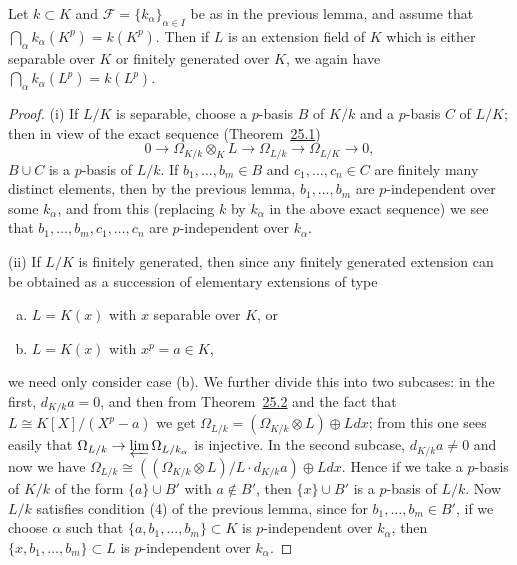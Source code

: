 \begin{lemma}\label{lem:30.5}
Let $k \subset K$ and $\mathcal{F} = \{k_\alpha\}_{\alpha \in I}$ be as in the previous lemma, and
assume that $\bigcap_\alpha k_\alpha(K^p) = k(K^p)$. Then if $L$ is an extension field of $K$
which is either separable over $K$ or finitely generated over $K$, we again have
$\bigcap_\alpha k_\alpha(L^p) = k(L^p)$.
\end{lemma}

\begin{proof}
(i) If $L/K$ is separable, choose a $p$-basis $B$ of $K/k$ and a $p$-basis $C$ of
$L/K$; then in view of the exact sequence (Theorem~\hyperref[thm:25.1]{25.1})
\[
  0 \to \Omega_{K/k} \otimes_K L \to \Omega_{L/k} \to \Omega_{L/K} \to 0,
\]
$B \cup C$ is a $p$-basis of $L/k$. If $b_1, \ldots, b_m \in B$ and $c_1, \ldots, c_n \in C$ are
finitely many distinct elements, then by the previous lemma, $b_1, \ldots, b_m$ are
$p$-independent over some $k_\alpha$, and from this (replacing $k$ by $k_\alpha$ in the
above exact sequence) we see that $b_1, \ldots, b_m, c_1, \ldots, c_n$ are
$p$-independent over $k_\alpha$.

(ii) If $L/K$ is finitely generated, then since any finitely generated extension
can be obtained as a succession of elementary extensions of type
\begin{enumerate}[(a)]
  \item $L = K(x)$ with $x$ separable over $K$,
  or
  \item $L = K(x)$ with $x^p = a \in K$,
\end{enumerate}
we need only consider case (b). We further divide this into two subcases: in
the first, $d_{K/k}a = 0$, and then from Theorem~\hyperref[thm:25.2]{25.2} and the fact that
$L \cong K[X]/(X^p - a)$ we get $\Omega_{L/k} = (\Omega_{K/k} \otimes L) \oplus Ldx$; from this
one sees easily that $\Omega_{L/k} \to \varprojlim \Omega_{L/k_\alpha}$ is injective. In the second
subcase, $d_{K/k}a \ne 0$ and now we have
$\Omega_{L/k} \cong ((\Omega_{K/k} \otimes L)/L \cdot d_{K/k}a) \oplus Ldx$. Hence if we take a
$p$-basis of $K/k$ of the form $\{a\} \cup B'$ with $a \notin B'$, then $\{x\} \cup B'$ is a
$p$-basis of $L/k$. Now $L/k$ satisfies condition (4) of the previous lemma, since
for $b_1, \ldots, b_m \in B'$, if we choose $\alpha$ such that $\{a, b_1, \ldots, b_m\} \subset K$
is $p$-independent over $k_\alpha$, then $\{x, b_1, \ldots, b_m\} \subset L$ is $p$-independent
over $k_\alpha$.
\end{proof}

